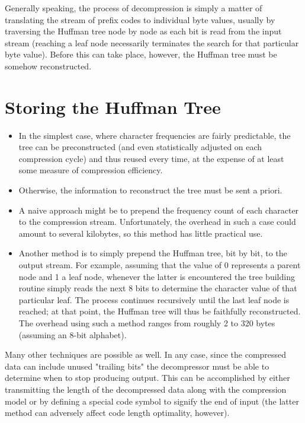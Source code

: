 \documentclass[12pt]{report}
\begin{document}
Generally speaking, the process of decompression is simply a matter of translating the stream of prefix codes to individual byte values, usually by traversing the Huffman tree node by node as each bit is read from the input stream (reaching a leaf node necessarily terminates the search for that particular byte value). Before this can take place, however, the Huffman tree must be somehow reconstructed.

\section{Storing the Huffman Tree}

\begin{itemize}
\item In the simplest case, where character frequencies are fairly predictable, the tree can be preconstructed (and even statistically adjusted on each compression cycle) and thus reused every time, at the expense of at least some measure of compression efficiency.

\item Otherwise, the information to reconstruct the tree must be sent a priori.

\item A naive approach might be to prepend the frequency count of each character to the compression stream. Unfortunately, the overhead in such a case could amount to several kilobytes, so this method has little practical use.

\item Another method is to simply prepend the Huffman tree, bit by bit, to the output stream. For example, assuming that the value of 0 represents a parent node and 1 a leaf node, whenever the latter is encountered the tree building routine simply reads the next 8 bits to determine the character value of that particular leaf. The process continues recursively until the last leaf node is reached; at that point, the Huffman tree will thus be faithfully reconstructed. The overhead using such a method ranges from roughly 2 to 320 bytes (assuming an 8-bit alphabet). 

\begin{figure}[h!]
	\centering
\end{figure}

\end{itemize}

Many other techniques are possible as well. In any case, since the compressed data can include unused "trailing bits" the decompressor must be able to determine when to stop producing output. This can be accomplished by either transmitting the length of the decompressed data along with the compression model or by defining a special code symbol to signify the end of input (the latter method can adversely affect code length optimality, however).
\end{document}
